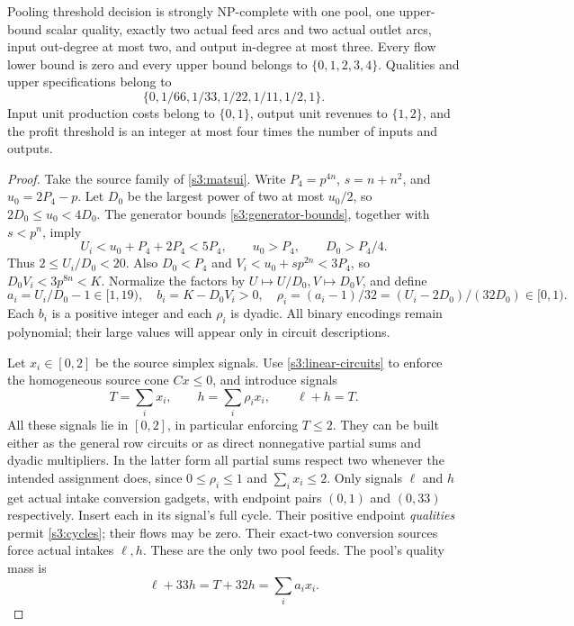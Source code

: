\begin{theorem}\label{s3:constant-thm}
Pooling threshold decision is strongly NP-complete with one pool, one
upper-bound scalar quality, exactly two actual feed arcs and two actual
outlet arcs, input out-degree at most two, and output in-degree at most
three. Every flow lower bound is zero and every upper bound belongs to
$\{0,1,2,3,4\}$. Qualities and upper specifications belong to
\begin{equation}
 \{0,1/66,1/33,1/22,1/11,1/2,1\}.\label{s3:palette}
\end{equation}
Input unit production costs belong to $\{0,1\}$, output unit revenues
to $\{1,2\}$, and the profit threshold is an integer at most four times
the number of inputs and outputs.
\end{theorem}
\begin{proof}
Take the source family of \cref{s3:matsui}. Write $P_4=p^{4n}$,
$s=n+n^2$, and $u_0=2P_4-p$. Let $D_0$ be the largest power of two
at most $u_0/2$, so $2D_0\le u_0<4D_0$. The generator bounds
\eqref{s3:generator-bounds}, together with $s<p^n$, imply
\[
 U_i<u_0+P_4+2P_4<5P_4,\qquad
 u_0>P_4,\qquad D_0>P_4/4.
\]
Thus $2\le U_i/D_0<20$. Also $D_0<P_4$ and
$V_i<u_0+sp^{2n}<3P_4$, so $D_0V_i<3p^{8n}<K$.
Normalize the factors by $U\mapsto U/D_0,V\mapsto D_0V$, and define
\begin{equation}
 a_i=U_i/D_0-1\in[1,19),\quad b_i=K-D_0V_i>0,
 \quad \rho_i=(a_i-1)/32=(U_i-2D_0)/(32D_0)\in[0,1).
 \label{s3:dyadic-data}
\end{equation}
Each $b_i$ is a positive integer and each $\rho_i$ is dyadic. All
binary encodings remain polynomial; their large values will appear
only in circuit descriptions.

Let $x_i\in[0,2]$ be the source simplex signals. Use
\cref{s3:linear-circuits} to enforce the homogeneous source cone
$Cx\le0$, and introduce signals
\begin{equation}
 T=\sum_i x_i,\qquad h=\sum_i\rho_ix_i,\qquad \ell+h=T.
 \label{s3:two-feeds}
\end{equation}
All these signals lie in $[0,2]$, in particular enforcing $T\le2$.
They can be built either as the general row circuits or as direct
nonnegative partial sums and dyadic multipliers. In the latter form all
partial sums respect two whenever the intended assignment does, since
$0\le\rho_i\le1$ and $\sum_i x_i\le2$.
Only signals $\ell$ and $h$ get actual intake conversion gadgets, with
endpoint pairs $(0,1)$ and $(0,33)$ respectively. Insert each in its
signal's full cycle. Their positive endpoint \emph{qualities} permit
\cref{s3:cycles}; their flows may be zero. Their exact-two conversion
sources force actual intakes $\ell,h$. These are the only two pool feeds.
The pool's quality mass is
\begin{equation}
 \ell+33h=T+32h=\sum_i a_ix_i.\label{s3:mass-two-feeds}
\end{equation}


\end{proof}
